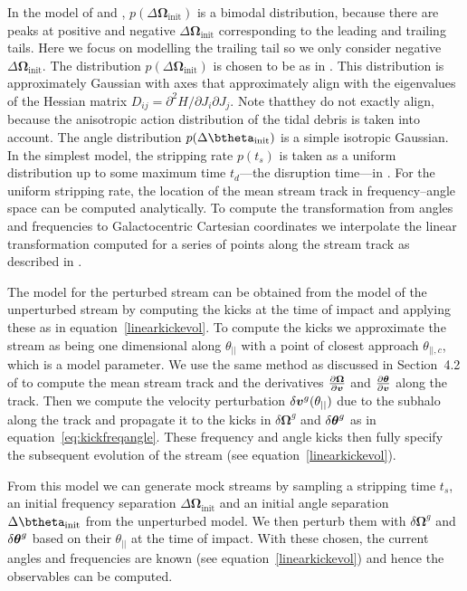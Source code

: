 \documentclass[useAMS,usenatbib,fleqn,a4paper]{mn2e}
\newcommand{\bs}[1]{\bmath{#1}}
\begin{document}
In the model of \cite{Bovy2014} and \cite{Sanders2014}, $p(\Delta\boldsymbol{\Omega}_\mathrm{init})$ is a bimodal distribution, because there are peaks at positive and negative $\Delta\boldsymbol{\Omega}_\mathrm{init}$ corresponding to the leading and trailing tails. Here we focus on modelling the trailing tail so we only consider negative $\Delta\boldsymbol{\Omega}_\mathrm{init}$. The distribution $p(\Delta\boldsymbol{\Omega}_\mathrm{init})$ is chosen to be as in \cite{Bovy2014}. This distribution is approximately Gaussian with axes that approximately align with the eigenvalues of the Hessian matrix $D_{ij}=\partial^2H/\partial J_i\partial J_j$. Note thatthey do not exactly align, because the anisotropic action distribution of the tidal debris is taken into account. The angle distribution $p(\Delta\btheta_\mathrm{init})$ is a simple isotropic Gaussian. In the simplest model, the stripping rate $p(t_s)$ is taken as a uniform distribution up to some maximum time $t_d$---the disruption time---in \cite{Bovy2014}. For the uniform stripping rate, the location of the mean stream track in frequency--angle space can be computed analytically. To compute the transformation from angles and frequencies to Galactocentric Cartesian coordinates we interpolate the linear transformation computed for a series of points along the stream track as described in \cite{Bovy2014}.

The model for the perturbed stream can be obtained from the model of the unperturbed stream by computing the kicks at the time of impact and applying these as in equation~\eqref{linearkickevol}. To compute the kicks we approximate the stream as being one dimensional along $\theta_{||}$ with a point of closest approach $\theta_{||,c}$, which is a model parameter. We use the same method as discussed in Section~4.2 of \cite{Bovy2014} to compute the mean stream track and the derivatives $\frac{\upartial \boldsymbol{\Omega}}{\upartial \bs{v}}$ and $\frac{\upartial \bs{\theta}}{\upartial \bs{v}}$ along the track. Then we compute the velocity perturbation $\delta\bs{v}^g(\theta_{||})$ due to the subhalo along the track and propagate it to the kicks in $\delta \boldsymbol{\Omega}^g$ and $\delta \bs{\theta}^g$ as in equation~\eqref{eq:kickfreqangle}. These frequency and angle kicks then fully specify the subsequent evolution of the stream (see equation~\eqref{linearkickevol}).

From this model we can generate mock streams by sampling a stripping time $t_s$, an initial frequency separation $\Delta\boldsymbol{\Omega}_\mathrm{init}$ and an initial angle separation $\Delta\btheta_\mathrm{init}$ from the unperturbed model. We then perturb them with $\delta \boldsymbol{\Omega}^g$ and $\delta \bs{\theta}^g$ based on their $\theta_{||}$ at the time of impact. With these chosen, the current angles and frequencies are known (see equation~\eqref{linearkickevol}) and hence the observables can be computed.
\end{document}
